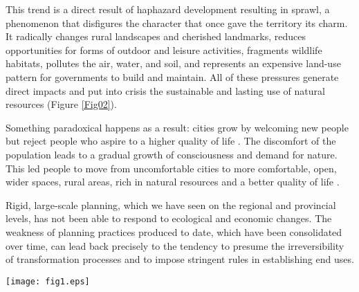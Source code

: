 \documentclass[10pt,a4paper]{article}
\begin{document}
\begin{multicols}{2}
This trend is a direct result of haphazard development resulting in sprawl, a phenomenon that disfigures the character that once gave the territory its charm. It radically changes rural landscapes and cherished landmarks, reduces opportunities for forms of outdoor and leisure activities, fragments wildlife habitats, pollutes the air, water, and soil, and represents an expensive land-use pattern for governments to build and maintain. All of these pressures generate direct impacts and put into crisis the sustainable and lasting use of natural resources (Figure \ref{Fig02}).

Something paradoxical happens as a result: cities grow by welcoming new people but reject people who aspire to a higher quality of life \citep{r07, r08, r09}. The discomfort of the population leads to a gradual growth of consciousness and demand for nature. This led people to move from uncomfortable cities to more comfortable, open, wider spaces, rural areas, rich in natural resources and a better quality of life \citep{r10, r11}.

Rigid, large-scale planning, which we have seen on the regional and provincial levels, has not been able to respond to ecological and economic changes. The weakness of planning practices produced to date, which have been consolidated over time, can lead back precisely to the tendency to presume the irreversibility of transformation processes and to impose stringent rules in establishing end uses.

\vspace{\baselineskip}

\end{multicols}

\noindent
\begin{minipage}{\columnwidth}
\centering
\resizebox{0.7\columnwidth}{!}
{\texttt{[image: fig1.eps]}}
\end{minipage}
\end{document}
